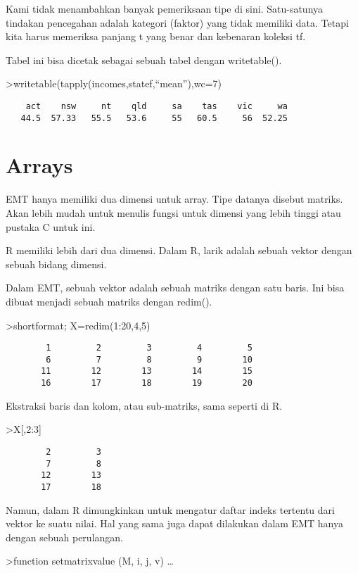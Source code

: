 \documentclass[
]{book}
\begin{document}
Kami tidak menambahkan banyak pemeriksaan tipe di sini. Satu-satunya tindakan pencegahan adalah kategori (faktor) yang tidak memiliki data. Tetapi kita harus memeriksa panjang t yang benar dan kebenaran koleksi tf.

Tabel ini bisa dicetak sebagai sebuah tabel dengan writetable().

\textgreater writetable(tapply(incomes,statef,``mean''),wc=7)

\begin{verbatim}
    act    nsw     nt    qld     sa    tas    vic     wa
   44.5  57.33   55.5   53.6     55   60.5     56  52.25
\end{verbatim}

\section{Arrays}\label{arrays}

EMT hanya memiliki dua dimensi untuk array. Tipe datanya disebut matriks. Akan lebih mudah untuk menulis fungsi untuk dimensi yang lebih tinggi atau pustaka C untuk ini.

R memiliki lebih dari dua dimensi. Dalam R, larik adalah sebuah vektor dengan sebuah bidang dimensi.

Dalam EMT, sebuah vektor adalah sebuah matriks dengan satu baris. Ini bisa dibuat menjadi sebuah matriks dengan redim().

\textgreater shortformat; X=redim(1:20,4,5)

\begin{verbatim}
        1         2         3         4         5 
        6         7         8         9        10 
       11        12        13        14        15 
       16        17        18        19        20 
\end{verbatim}

Ekstraksi baris dan kolom, atau sub-matriks, sama seperti di R.

\textgreater X{[},2:3{]}

\begin{verbatim}
        2         3 
        7         8 
       12        13 
       17        18 
\end{verbatim}

Namun, dalam R dimungkinkan untuk mengatur daftar indeks tertentu dari vektor ke suatu nilai. Hal yang sama juga dapat dilakukan dalam EMT hanya dengan sebuah perulangan.

\textgreater function setmatrixvalue (M, i, j, v) \ldots{}
\end{document}
